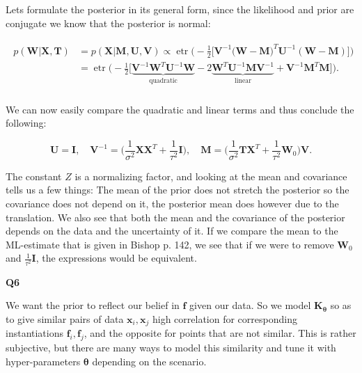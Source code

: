 \documentclass[a4paper]{article}
\DeclareMathOperator{\etr}{etr}
\begin{document}
\noindent Lets formulate the posterior in its general form, since the likelihood and prior are conjugate we know that the posterior is normal:

\begin{align*}
\begin{split}
p(\mathbf{W}\vert \mathbf{X},\mathbf{T})&=p(\mathbf{X\vert M,U,V})\propto\etr\bigg(-\frac{1}{2}\bigg[\mathbf{V}^{-1}\big(\mathbf{W}-\mathbf{M}\big)^T\mathbf{U}^{-1}(\mathbf{W}-\mathbf{M})\bigg]\bigg) \\ &= \etr\bigg(-\frac{1}{2}\bigg[\underbrace{\mathbf{V}^{-1}\mathbf{W}^T\mathbf{U}^{-1}\mathbf{W}}_{\text{quadratic}}-2\underbrace{\mathbf{W}^T\mathbf{U}^{-1}\mathbf{M}\mathbf{V}^{-1}}_{\text{linear}}+\mathbf{V}^{-1}\mathbf{M}^T\mathbf{M}\bigg]\bigg).
\end{split}\\
\end{align*}

\noindent We can now easily compare the quadratic and linear terms and thus conclude the following:

\begin{equation*}
\mathbf{U}=\mathbf{I},\quad \mathbf{V}^{-1}=\bigg(\frac{1}{\sigma^2}\mathbf{XX}^T+\frac{1}{\tau^2}\mathbf{I}\bigg), \quad \mathbf{M}=\bigg(\frac{1}{\sigma^2}\mathbf{TX}^T+\frac{1}{\tau^2}\mathbf{W}_0\bigg)\mathbf{V}.
\end{equation*}

\noindent The constant $Z$ is a normalizing factor, and looking at the mean and covariance tells us a few things: The mean of the prior does not stretch the posterior so the covariance does not depend on it, the posterior mean does however due to the translation. We also see that both the mean and the covariance of the posterior depends on the data and the uncertainty of it. If we compare the mean to the ML-estimate that is given in Bishop p. 142, we see that if we were to remove $\mathbf{W}_0$ and $\frac{1}{\tau^2}\mathbf{I}$, the expressions would be equivalent.

\hfill

\noindent\textbf{Q6}
 
\noindent\makebox[\linewidth]{\rule{\textwidth}{0.4pt}}

\hfill

\noindent We want the prior to reflect our belief in $\mathbf{f}$ given our data. So we model $\mathbf{K_{\theta}}$ so as to give similar pairs of data $\mathbf{x}_i, \mathbf{x}_j$ high correlation for corresponding instantiations $\mathbf{f}_i, \mathbf{f}_j$, and the opposite for points that are not similar. This is rather subjective, but there are many ways to model this similarity and tune it with hyper-parameters $\mathbf{\theta}$ depending on the scenario.
\end{document}
